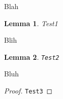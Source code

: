\documentclass{article}
\newtheorem{lemma}{Lemma}
\begin{document}
Blah
\begin{lemma}Test1\end{lemma}
Blih
\begin{lemma}\verb|Test2|\end{lemma}
Bluh
\begin{proof}\verb|Test3|\end{proof}
\end{document}
